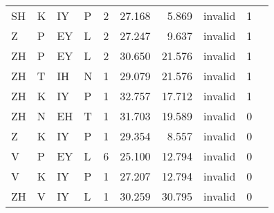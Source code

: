 \begin{longtable}{l@{ } l@{ } l@{ } l r r r r r r}
$$SH & K & IY & P & 2 & 27.168 & 5.869 & invalid & 1 \\
Z & P & EY & L & 2 & 27.247 & 9.637 & invalid & 1 \\
ZH & P & EY & L & 2 & 30.650 & 21.576 & invalid & 1 \\
ZH & T & IH & N & 1 & 29.079 & 21.576 & invalid & 1 \\
ZH & K & IY & P & 1 & 32.757 & 17.712 & invalid & 1 \\
ZH & N & EH & T & 1 & 31.703 & 19.589 & invalid & 0 \\
Z & K & IY & P & 1 & 29.354 & 8.557 & invalid & 0 \\
V & P & EY & L & 6 & 25.100 & 12.794 & invalid & 0 \\
V & K & IY & P & 1 & 27.207 & 12.794 & invalid & 0 \\
ZH & V & IY & L & 1 & 30.259 & 30.795 & invalid & 0 \\
\bottomrule
\end{longtable}
